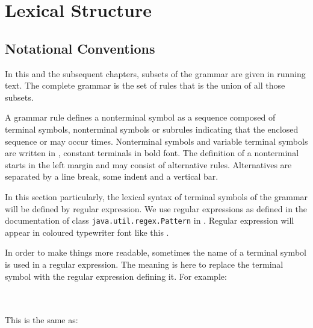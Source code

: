 
\chapter{Lexical Structure} \label{lexical structure}

\section{Notational Conventions}

In this and the subsequent chapters, subsets of the \frege{} grammar are given in running text. The complete grammar is the set of rules that is the union of all those subsets.

\par A
grammar rule defines a nonterminal symbol as a sequence composed of terminal symbols, nonterminal symbols or subrules indicating that the enclosed sequence  or may occur  times.
Nonterminal symbols and variable terminal symbols are written in , constant terminals in bold  font.
The definition of a nonterminal starts in the left margin and may
consist of alternative rules. Alternatives are separated by a
line break, some indent and a vertical bar.

\par In this section particularly, the lexical syntax of terminal symbols of the grammar will be defined by regular expression.
We use regular expressions as defined in the documentation of class
\texttt{java.util.regex.Pattern} in \cite{apidoc}. Regular expression
will appear in coloured typewriter font like this
.

In order to make things more readable, sometimes the name of a terminal symbol is used in a regular expression. The meaning is here to replace the terminal symbol with the regular expression defining it. For example:

\begin{flushleft}
  \\
   \\
This is the same as:\\
 
\end{flushleft}

